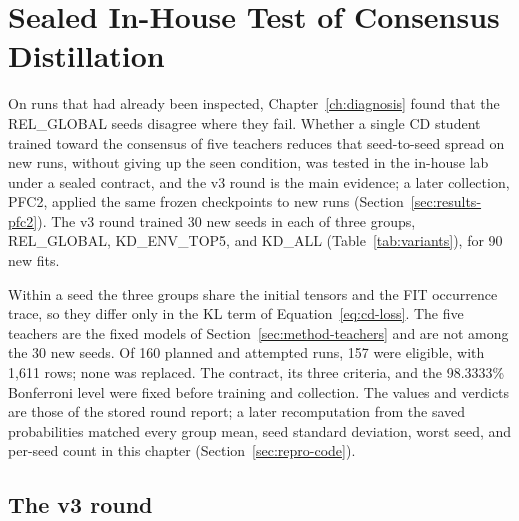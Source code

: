 \chapter{Sealed In-House Test of Consensus Distillation}
\label{ch:results}

On runs that had already been inspected, Chapter~\ref{ch:diagnosis}
found that the REL\_GLOBAL seeds disagree where they fail. Whether a
single CD student trained toward the consensus of five teachers reduces
that seed-to-seed spread on new runs, without giving up the seen
condition, was tested in the in-house lab under a sealed contract, and
the v3 round is the main evidence; a later collection, PFC2, applied the
same frozen checkpoints to new runs (Section~\ref{sec:results-pfc2}). The v3 round trained 30 new seeds in each of three groups,
REL\_GLOBAL, KD\_ENV\_TOP5, and KD\_ALL (Table~\ref{tab:variants}),
for 90 new fits.

Within a seed the three groups share the initial
tensors and the FIT occurrence trace, so they differ only in the KL
term of Equation~\ref{eq:cd-loss}. The five teachers are the fixed
models of Section~\ref{sec:method-teachers} and are not among the 30
new seeds. Of 160 planned and attempted runs, 157 were eligible, with
1,611 rows; none was replaced. The contract, its three criteria, and
the 98.3333\% Bonferroni level were fixed before training and
collection. The values and verdicts are those of the stored round
report; a later recomputation from the saved probabilities matched
every group mean, seed standard deviation, worst seed, and per-seed
count in this chapter (Section~\ref{sec:repro-code}).

\section{The v3 round}
\label{sec:results-v3}

